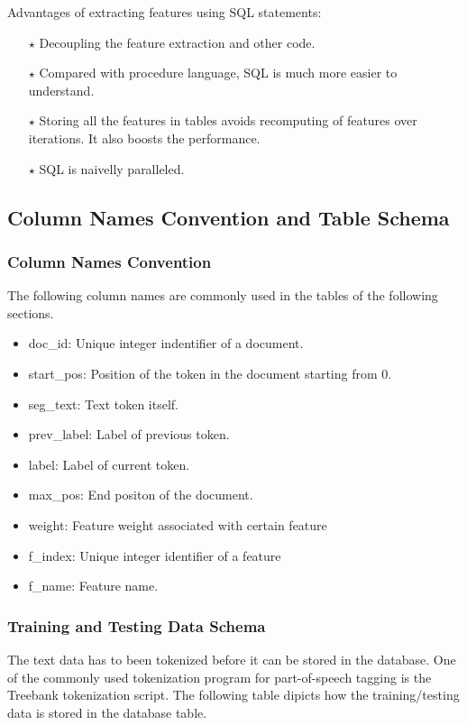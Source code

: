 Advantages of extracting features using SQL statements:
\begin{itemize}
\item [$\star$] Decoupling the feature extraction and other code.
\item [$\star$] Compared with procedure language, SQL is much more easier to understand.
\item [$\star$] Storing all the features in tables avoids recomputing of features over iterations. It also boosts the performance.
\item [$\star$] SQL is naivelly paralleled.
\end{itemize}

\subsection{Column Names Convention and Table Schema}
\subsubsection{Column Names Convention}
The following column names are commonly used in the tables of the following sections.
\begin{itemize}
\item doc\_id: Unique integer indentifier of a document.
\item start\_pos: Position of the token in the document starting from 0.
\item seg\_text: Text token itself.
\item prev\_label: Label of previous token.
\item label: Label of current token.
\item max\_pos: End positon of the document.
\item weight: Feature weight associated with certain feature
\item f\_index: Unique integer identifier of a feature
\item f\_name: Feature name. 
\end{itemize}

\subsubsection{Training and Testing Data Schema}
The text data has to been tokenized before it can be stored in the database. One of the commonly used tokenization program for part-of-speech 
tagging is the Treebank tokenization script.
The following table dipicts how the training/testing data is stored in the database table. 


